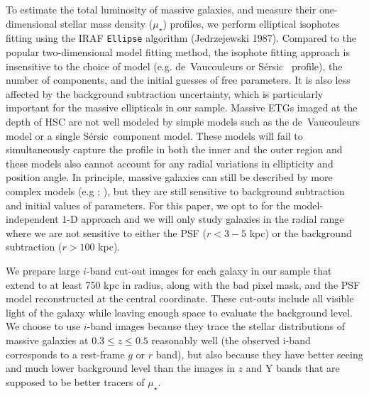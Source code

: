 \documentclass{emulateapj}
\def\ser{{S\'{e}rsic\ }}
\def\mden{{$\mu_{\star}$}}
\begin{document}
\begin{CJK*}{UTF8}{gbsn}
    To estimate the total luminosity of massive galaxies, and measure their 
    one-dimensional stellar mass density (\mden{}) profiles, we perform elliptical 
    isophotes fitting using the IRAF \texttt{Ellipse} algorithm (Jedrzejewski 1987).  
    Compared to the popular two-dimensional model fitting method, the isophote fitting
    approach is insensitive to the choice of model (e.g. de~Vaucouleurs or \ser{} 
    profile), the number of components, and the initial guesses of free parameters. 
    It is also less affected by the background subtraction uncertainty, which is 
    particularly important for the massive ellipticals in our sample.
    Massive ETGs imaged at the depth of HSC are not well modeled by simple models such 
    as the de~Vaucouleurs model or a single \ser component model. 
    These models will fail to simultaneously capture the profile in both the inner and 
    the outer region and these models also cannot account for any radial variations in 
    ellipticity and position angle. 
    In principle, massive galaxies can still be described by more complex 
    models (e.g \citealt{Huang2013a}; \citealt{Huang2013b}), but they are still 
    sensitive to background subtraction and initial values of parameters. 
    For this paper, we opt to for the model-independent 1-D approach and we will only 
    study galaxies in the radial range where we are not sensitive to either the PSF 
    ($r<3-5$ kpc) or the background subtraction ($r>100$ kpc). 
        
    We prepare large $i$-band cut-out images for each galaxy in our sample that extend 
    to at least 750 kpc in radius, along with the bad pixel mask, and the PSF model 
    reconstructed at the central coordinate. 
    These cut-outs include all visible light of the galaxy while leaving enough space 
    to evaluate the background level. 
    We choose to use $i$-band images because they trace the stellar distributions of 
    massive galaxies at $0.3 \leq z \leq 0.5$ reasonably well 
    (the observed i-band corresponds to a rest-frame $g$ or $r$ band), but also 
    because they have better seeing and much lower background level than the images 
    in $z$ and Y bands that are supposed to be better tracers of \mden{}. 
    

\end{CJK*}
\end{document}
